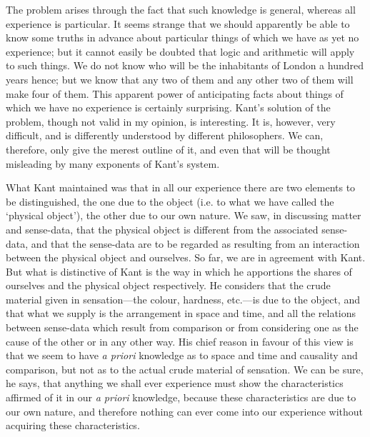 \documentclass[oneside,letterpaper,12pt]{book}
\begin{document}
The problem arises through the fact that such knowledge is general,
whereas all experience is particular. It seems strange that we should
apparently be able to know some truths in advance about particular
things of which we have as yet no experience; but it cannot easily be
doubted that logic and arithmetic will apply to such things. We do not
know who will be the inhabitants of London a hundred years hence; but we
know that any two of them and any other two of them will make four of
them. This apparent power of anticipating facts about things of which we
have no experience is certainly surprising. Kant's
solution of the problem, though not valid in my opinion, is interesting.
It is, however, very difficult, and is differently understood by
different philosophers. We can, therefore, only give the merest outline
of it, and even that will be thought misleading by many exponents of
Kant's system.

\label{Kant} What Kant maintained was that in all our experience there are two
elements to be distinguished, the one due to the object (i.e. to what we
have called the `physical object'), the
other due to our own nature. We saw, in discussing matter and
sense-data, that the physical object is different from the associated
sense-data, and that the sense-data are to be regarded as resulting from
an interaction between the physical object and ourselves. So far, we are
in agreement with Kant. But what is distinctive of Kant is the way in
which he apportions the shares of ourselves and the physical object
respectively. He considers that the crude material given in
sensation---the colour, hardness, etc.---is due to the object, and that
what we supply is the arrangement in space and time, and all the
relations between sense-data which result from comparison or from
considering one as the cause of the other or in any other way. His chief
reason in favour of this view is that we seem to have \emph{a priori}
knowledge as to space and time and causality and comparison, but not as
to the actual crude material of sensation. We can be sure, he says, that
anything we shall ever experience must show the characteristics affirmed
of it in our \emph{a priori} knowledge, because these characteristics
are due to our own nature, and therefore nothing can ever come into our
experience without acquiring these characteristics.
\end{document}
